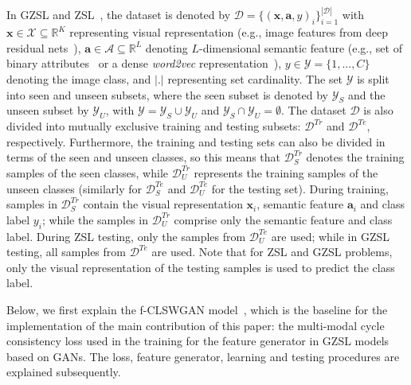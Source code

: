 \documentclass[runningheads]{llncs}
\begin{document}
In GZSL and ZSL~\cite{XianCVPR2017}, the dataset is denoted by $\mathcal{D} = \{(\textbf{x},\mathbf{a},y)_i\}_{i=1}^{|\mathcal{D}|}$ with $\textbf{x} \in \mathcal{X} \subseteq \mathbb{R}^K$ representing visual representation (e.g., image features from deep residual nets~\cite{he2016resnet}), $\mathbf{a} \in \mathcal{A} \subseteq \mathbb R^L$ denoting $L$-dimensional semantic feature (e.g., set of binary attributes~\cite{lampert2014attribute} or a dense \textit{word2vec} representation~\cite{mikolov2013distributed}), $y \in \mathcal{Y} = \{ 1,..., C \}$ denoting the image class, and $|.|$ representing set cardinality.
The set $\mathcal{Y}$ is split into seen and unseen subsets, where the seen subset is denoted by $\mathcal{Y}_S$ and the unseen subset by $\mathcal{Y}_U$, with $\mathcal{Y} = \mathcal{Y}_S \cup \mathcal{Y}_U$ and $\mathcal{Y}_S \cap \mathcal{Y}_U = \emptyset$.  The dataset $\mathcal{D}$ is also divided into mutually exclusive training and testing subsets: $\mathcal{D}^{Tr}$ and $\mathcal{D}^{Te}$, respectively.
Furthermore, the training and testing sets can also be divided in terms of the seen and unseen classes, so this means that $\mathcal{D}^{Tr}_S$ denotes the training samples of the seen classes, while $\mathcal{D}^{Tr}_U$ represents the training samples of the unseen classes (similarly for $\mathcal{D}^{Te}_S$ and $\mathcal{D}^{Te}_U$ for the testing set).
During training, samples in $\mathcal{D}_S^{Tr}$ contain the visual representation $\mathbf{x}_i$, semantic feature $\mathbf{a}_i$ and class label $y_i$; while the samples in $\mathcal{D}_U^{Tr}$ comprise only the semantic feature and class label.  During ZSL testing, only the samples from $\mathcal{D}_U^{Te}$ are used; while in GZSL testing, all samples from $\mathcal{D}^{Te}$ are used.  Note that for ZSL and GZSL problems, only the visual representation of the testing samples is used to predict the class label.

Below, we first explain the f-CLSWGAN model~\cite{XianCVPR2018}, which is the baseline for the implementation of the main contribution of this paper: the multi-modal cycle consistency loss used in the training for the feature generator in GZSL models based on GANs.  The loss, feature generator, learning and testing procedures are explained subsequently.  
\end{document}
